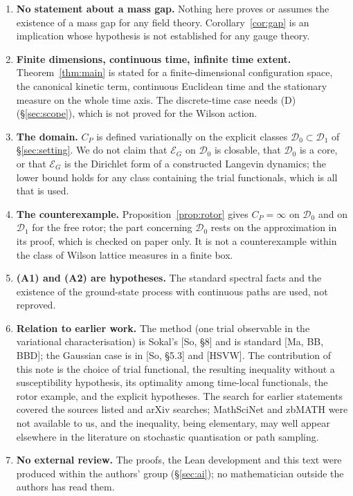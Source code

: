 \documentclass[11pt,a4paper]{article}
\theoremstyle{definition}
\theoremstyle{remark}
\newcommand{\cE}{\mathcal{E}}
\newcommand{\cD}{\mathcal{D}}
\begin{document}
\begin{enumerate}[label=\arabic*.]
\item \textbf{No statement about a mass gap.} Nothing here proves or assumes the existence of a mass gap for any field theory. Corollary~\ref{cor:gap} is an implication whose hypothesis is not established for any gauge theory.
\item \textbf{Finite dimensions, continuous time, infinite time extent.} Theorem~\ref{thm:main} is stated for a finite-dimensional configuration space, the canonical kinetic term, continuous Euclidean time and the stationary measure on the whole time axis. The discrete-time case needs (D) (\S\ref{sec:scope}), which is not proved for the Wilson action.
\item \textbf{The domain.} $C_P$ is defined variationally on the explicit classes $\cD_0\subset\cD_1$ of \S\ref{sec:setting}. We do not claim that $\cE_G$ on $\cD_0$ is closable, that $\cD_0$ is a core, or that $\cE_G$ is the Dirichlet form of a constructed Langevin dynamics; the lower bound holds for any class containing the trial functionals, which is all that is used.
\item \textbf{The counterexample.} Proposition~\ref{prop:rotor} gives $C_P=\infty$ on $\cD_0$ and on $\cD_1$ for the free rotor; the part concerning $\cD_0$ rests on the approximation in its proof, which is checked on paper only. It is not a counterexample within the class of Wilson lattice measures in a finite box.
\item \textbf{(A1) and (A2) are hypotheses.} The standard spectral facts and the existence of the ground-state process with continuous paths are used, not reproved.
\item \textbf{Relation to earlier work.} The method (one trial observable in the variational characterisation) is Sokal's [So, \S8] and is standard [Ma, BB, BBD]; the Gaussian case is in [So, \S5.3] and [HSVW]. The contribution of this note is the choice of trial functional, the resulting inequality without a susceptibility hypothesis, its optimality among time-local functionals, the rotor example, and the explicit hypotheses. The search for earlier statements covered the sources listed and arXiv searches; MathSciNet and zbMATH were not available to us, and the inequality, being elementary, may well appear elsewhere in the literature on stochastic quantisation or path sampling.
\item \textbf{No external review.} The proofs, the Lean development and this text were produced within the authors' group (\S\ref{sec:ai}); no mathematician outside the authors has read them.
\end{enumerate}
\end{document}
